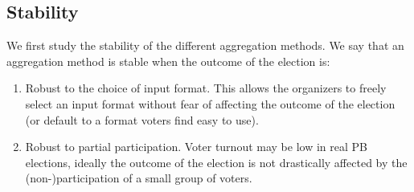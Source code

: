 \documentclass{comsoc2023}
\newcommand{\mes}{ES}
\begin{document}
\subsection{Stability} 

 



We first study the   stability of the different aggregation methods. %
We say that an aggregation method is stable when the outcome of the election is:
\begin{enumerate}
\item Robust to the choice of input format. This allows the organizers to freely select an input format without fear of affecting the outcome of the election (or default to a format voters find easy to use). 
\item  Robust to partial participation.   Voter turnout may be low in real PB elections, ideally the outcome of the election is not drastically affected by the (non-)participation of a small group of voters. 
\end{enumerate}
\end{document}
